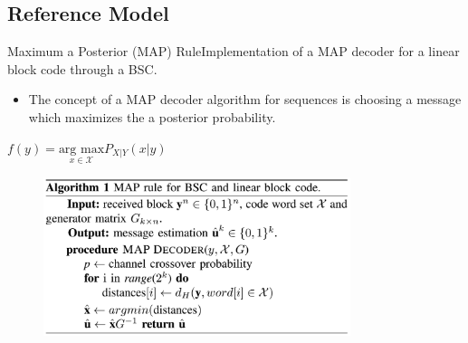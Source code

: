 \documentclass{beamer}
\begin{document}
\subsection{Reference Model}
\begin{frame}{Maximum a Posterior (MAP) Rule}{Implementation of a MAP decoder for a linear block code through a BSC.}

\begin{itemize}
\item{The concept of a MAP decoder algorithm for sequences is choosing a message which maximizes the a posterior probability.}
\end{itemize}

\begin{center}
$f(y) = \underset{x\in \mathcal{X}}{\text{arg max}} P_{X|Y}(x|y)$
\end{center}

 \begin{figure}[!ht]
  \centering
    \includegraphics[width=0.8\textwidth]{images/algorithm}
\end{figure}

\end{frame}
\end{document}
